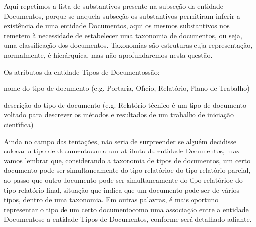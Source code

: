 \documentclass[
12pt,		%
openright,	%
twoside,  %
a4paper,			%
chapter=TITLE,		%
english,			%
french,				%
spanish,			%
brazil				%
]{USPSC-classe/USPSC}
\begin{document}
Aqui repetimos a lista de substantivos presente na subse\c{c}\~ao da entidade \textquotedbl Documentos\textquotedbl , porque se naquela subse\c{c}\~ao os substantivos permitiram inferir a exist\^encia de uma entidade \textquotedbl Documentos\textquotedbl , aqui os mesmos substantivos nos remetem \`a necessidade de estabelecer uma taxonomia de documentos, ou seja, uma classifica\c{c}\~ao dos documentos. Taxonomias s\~ao estruturas cuja representa\c{c}\~ao, normalmente, \'e hier\'arquica, mas n\~ao aprofundaremos nesta quest\~ao.














Os atributos da entidade \textquotedbl Tipos de Documentos\textquotedbl  s\~ao:















\begin{alineas}
\item nome do tipo de documento (e.g. Portaria, Of\'{\i}cio, Relat\'orio, Plano de Trabalho)
\item descri\c{c}\~ao do tipo de documento (e.g. \textquotedbl Relat\'orio t\'ecnico \'e um tipo de documento voltado para descrever os m\'etodos e resultados de um trabalho de inicia\c{c}\~ao cient\'{\i}fica\textquotedbl )
\end{alineas}

Ainda no campo das \textquotedbl tenta\c{c}\~oes\textquotedbl , n\~ao seria de surpreender se algu\'em decidisse colocar o \textquotedbl tipo de documento\textquotedbl  como um atributo da entidade \textquotedbl Documentos\textquotedbl , mas vamos lembrar que, considerando a taxonomia de tipos de documentos, um certo documento pode ser simultaneamente do tipo \textquotedbl relat\'orio\textquotedbl  e do tipo \textquotedbl relat\'orio parcial\textquotedbl , ao passo que outro documento pode ser simultaneamente do tipo \textquotedbl relat\'orio\textquotedbl  e do tipo \textquotedbl relat\'orio final\textquotedbl , situa\c{c}\~ao que indica que um documento pode ser de v\'arios tipos, dentro de uma taxonomia. Em outras palavras, \'e mais oportuno representar o \textquotedbl tipo de um certo documento\textquotedbl  como uma associa\c{c}\~ao entre a entidade \textquotedbl Documentos\textquotedbl  e a entidade \textquotedbl Tipos de Documentos\textquotedbl , conforme ser\'a detalhado adiante.
\end{document}
